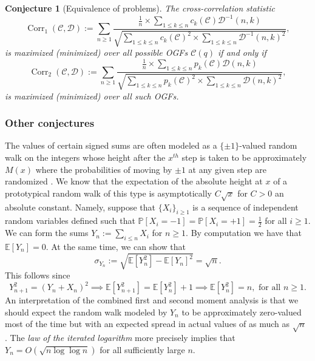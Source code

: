 \documentclass[12pt,reqno,a4letter]{article}
\numberwithin{figure}{section}
\numberwithin{table}{section}
\numberwithin{equation}{section}
\theoremstyle{plain}
\newtheorem{conjecture}[theorem]{Conjecture}
\numberwithin{theorem}{section}
\theoremstyle{definition}
\begin{document}
\begin{conjecture}[Equivalence of problems]
The cross-correlation statistic 
\[
\operatorname{Corr}_1(\mathcal{C},\mathcal{D}) := \sum_{n \geq 1} 
     \frac{\frac{1}{n} \times \sum\limits_{1 \leq k \leq n} c_k(\mathcal{C}) \mathcal{D}^{-1}(n, k)}{ 
     \sqrt{\sum\limits_{1 \leq k \leq n} c_k(\mathcal{C})^2 \times 
     \sum\limits_{1 \leq k \leq n} \mathcal{D}^{-1}(n, k)^2}}, 
\]
is maximized (minimized) over all possible OGFs $\mathcal{C}(q)$ if and only if 
\[
\operatorname{Corr}_2(\mathcal{C},\mathcal{D}) := \sum_{n \geq 1} 
     \frac{\frac{1}{n} \times \sum\limits_{1 \leq k \leq n} p_k(\mathcal{C}) \mathcal{D}(n, k)}{ 
     \sqrt{\sum\limits_{1 \leq k \leq n} p_k(\mathcal{C})^2 \times 
     \sum\limits_{1 \leq k \leq n} \mathcal{D}(n, k)^2}},
\]
is maximized (minimized) over all such OGFs. 
\end{conjecture}

\subsubsection{Other conjectures} 

The values of certain signed sums are often modeled as a $\{\pm 1\}$-valued random walk on the integers whose 
height after the $x^{th}$ step is taken to be approximately $M(x)$ where the probabilities of 
moving by $\pm 1$ at any given step are randomized \cite{ONTHERH-FRACTALRW,SMOOTH-RDMFUNCS}. 
We know that the expectation of the absolute height at $x$ of 
a prototypical random walk of this type is asymptotically $C\sqrt{x}$ for $C > 0$ an absolute constant. 
Namely, suppose that $\{X_i\}_{i \geq 1}$ is a sequence of independent random variables 
defined such that $\mathbb{P}[X_i=-1] = \mathbb{P}[X_i=+1] = \frac{1}{2}$ for all $i \geq 1$. 
We can form the sums $Y_n := \sum_{i \leq n} X_i$ for $n \geq 1$. 
By computation we have that $\mathbb{E}[Y_n] = 0$. 
At the same time, we can show that  
\[
\sigma_{Y_n} := \sqrt{\mathbb{E}[Y_n^2]-\mathbb{E}[Y_n]^2} = \sqrt{n}. 
\]
This follows since 
\[
Y_{n+1}^2 = (Y_n + X_n)^2 \implies \mathbb{E}[Y_{n+1}^2] = \mathbb{E}[Y_n^2] + 1 \implies 
     \mathbb{E}[Y_n^2] = n, \text{ for all } n \geq 1. 
\]
An interpretation of the combined first and second moment analysis is that we should 
expect the random walk modeled by $Y_n$ to be approximately zero-valued most of the time but 
with an expected spread in actual values of as much as $\sqrt{n}$ \cite{RHRW-WEBSITE-REF}. 
The \emph{law of the iterated logarithm} more precisely implies that 
$Y_n = O\left(\sqrt{n \log\log n}\right)$ for all sufficiently large $n$. 
\end{document}
